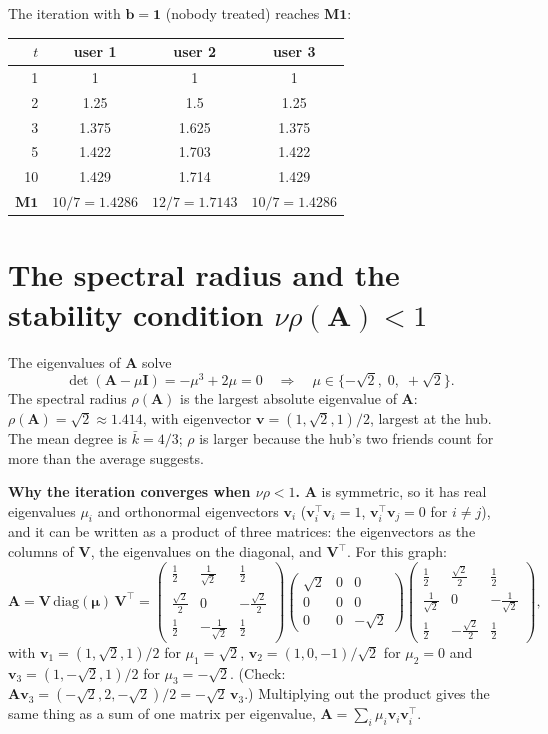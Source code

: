 \documentclass[11pt]{article}
\newcommand{\one}{\mathbf{1}}
\newcommand{\vb}{\boldsymbol{b}}
\newcommand{\vv}{\boldsymbol{v}}
\newcommand{\vmu}{\boldsymbol{\mu}}
\newcommand{\mA}{\mathbf{A}}
\newcommand{\mM}{\mathbf{M}}
\newcommand{\mI}{\mathbf{I}}
\newcommand{\mV}{\mathbf{V}}
\begin{document}
The iteration with $\vb = \one$ (nobody treated) reaches $\mM\one$:

\begin{center}
\begin{tabular}{rccc}
\toprule
$t$ & user 1 & user 2 & user 3 \\
\midrule
1 & 1 & 1 & 1 \\
2 & 1.25 & 1.5 & 1.25 \\
3 & 1.375 & 1.625 & 1.375 \\
5 & 1.422 & 1.703 & 1.422 \\
10 & 1.429 & 1.714 & 1.429 \\
\midrule
$\mM\one$ & $10/7 = 1.4286$ & $12/7 = 1.7143$ & $10/7 = 1.4286$ \\
\bottomrule
\end{tabular}
\end{center}

\section{The spectral radius and the stability condition $\nu\rho(\mA) < 1$}

The eigenvalues of $\mA$ solve
\[
\det(\mA - \mu \mI) = -\mu^3 + 2\mu = 0
\quad\Longrightarrow\quad
\mu \in \{-\sqrt2,\; 0,\; +\sqrt2\} .
\]
The spectral radius $\rho(\mA)$ is the largest absolute eigenvalue of $\mA$: $\rho(\mA) = \sqrt2 \approx 1.414$, with eigenvector $\vv = (1, \sqrt2, 1)/2$, largest at the hub.  The mean degree is $\bar k = 4/3$; $\rho$ is larger because the hub's two friends count for more than the average suggests.

\textbf{Why the iteration converges when $\nu\rho < 1$.}  $\mA$ is symmetric, so it has real eigenvalues $\mu_i$ and orthonormal eigenvectors $\vv_i$ ($\vv_i^\top \vv_i = 1$, $\vv_i^\top \vv_j = 0$ for $i \ne j$), and it can be written as a product of three matrices: the eigenvectors as the columns of $\mV$, the eigenvalues on the diagonal, and $\mV^\top$.  For this graph:
\[
\mA = \mV \,\mathrm{diag}(\vmu)\, \mV^\top
=
\begin{pmatrix} \tfrac12 & \tfrac1{\sqrt2} & \tfrac12 \\[2pt] \tfrac{\sqrt2}{2} & 0 & -\tfrac{\sqrt2}{2} \\[2pt] \tfrac12 & -\tfrac1{\sqrt2} & \tfrac12 \end{pmatrix}
\begin{pmatrix} \sqrt2 & 0 & 0 \\ 0 & 0 & 0 \\ 0 & 0 & -\sqrt2 \end{pmatrix}
\begin{pmatrix} \tfrac12 & \tfrac{\sqrt2}{2} & \tfrac12 \\[2pt] \tfrac1{\sqrt2} & 0 & -\tfrac1{\sqrt2} \\[2pt] \tfrac12 & -\tfrac{\sqrt2}{2} & \tfrac12 \end{pmatrix},
\]
with $\vv_1 = (1, \sqrt2, 1)/2$ for $\mu_1 = \sqrt2$, $\vv_2 = (1, 0, -1)/\sqrt2$ for $\mu_2 = 0$ and $\vv_3 = (1, -\sqrt2, 1)/2$ for $\mu_3 = -\sqrt2$.  (Check: $\mA \vv_3 = (-\sqrt2, 2, -\sqrt2)/2 = -\sqrt2\, \vv_3$.)  Multiplying out the product gives the same thing as a sum of one matrix per eigenvalue, $\mA = \sum_i \mu_i \vv_i \vv_i^\top$.
\end{document}
